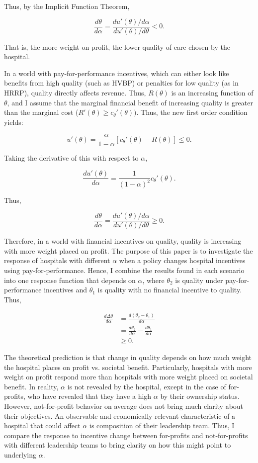 \documentclass[12pt]{article}
\begin{document}
    \noindent Thus, by the Implicit Function Theorem, 

    $$\frac{d\theta}{d\alpha} = \frac{du'(\theta)/d\alpha}{du'(\theta)/d\theta} < 0.$$

    \noindent That is, the more weight on profit, the lower quality of care chosen by the hospital.

    In a world with pay-for-performance incentives, which can either look like benefits from high quality (such as HVBP) or penalties for low quality (as in HRRP), quality directly affects revenue. Thus, $R(\theta)$ is an increasing function of $\theta$, and I assume that the marginal financial benefit of increasing quality is greater than the marginal cost ($R'(\theta)\geq c_{\theta}'(\theta))$. Thus, the new first order condition yields:

    $$u'(\theta) = \frac{\alpha}{1-\alpha} \left[c_{\theta}'(\theta)-R(\theta)\right] \leq 0.$$

    \noindent Taking the derivative of this with respect to $\alpha$,

    $$\frac{du'(\theta)}{d\alpha} = \frac{1}{(1-\alpha)^2}c_{\theta}'(\theta).$$

    Thus,

    $$\frac{d\theta}{d\alpha} = \frac{du'(\theta)/d\alpha}{du'(\theta)/d\theta}\geq0.$$

    Therefore, in a world with financial incentives on quality, quality is increasing with more weight placed on profit. The purpose of this paper is to investigate the response of hospitals with different $\alpha$ when a policy changes hospital incentives using pay-for-performance. Hence, I combine the results found in each scenario into one response function that depends on $\alpha$, where $\theta_2$ is quality under pay-for-performance incentives and $\theta_1$ is quality with no financial incentive to quality. Thus,

    \begin{align*}
        \frac{d\Delta\theta}{d\alpha}&=\frac{d(\theta_2-\theta_1)}{d\alpha}\\
        &=\frac{d\theta_2}{d\alpha}-\frac{d\theta_1}{d\alpha}\\
        &\geq 0.
    \end{align*}


    The theoretical prediction is that change in quality depends on how much weight the hospital places on profit vs. societal benefit. Particularly, hospitals with more weight on profit respond more than hospitals with more weight placed on societal benefit. In reality, $\alpha$ is not revealed by the hospital, except in the case of for-profits, who have revealed that they have a high $\alpha$ by their ownership status. However, not-for-profit behavior on average does not bring much clarity about their objectives. An observable and economically relevant characteristic of a hospital that could affect $\alpha$ is composition of their leadership team. Thus, I compare the response to incentive change between for-profits and not-for-profits with different leadership teams to bring clarity on how this might point to underlying $\alpha$.
    
\end{document}
